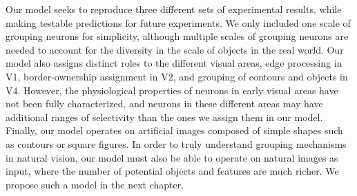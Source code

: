 Our model seeks to reproduce three different sets of experimental results, while making testable predictions for future experiments. 
We only included one scale of grouping neurons for simplicity, although 
multiple scales of grouping neurons are needed to account for the diversity in the scale of objects in the real world. Our model also assigns distinct roles to the different visual areas,  edge processing in V1, border-ownership assignment in V2, and grouping of contours and objects in V4. However, the physiological properties of neurons in early visual areas have not been fully characterized, and neurons in these different areas may have additional ranges of selectivity than the ones we assign them in our model. Finally, our model operates on artificial images composed of simple shapes such as contours or square
figures. In order to truly understand grouping mechanisms in natural
vision, our model must also be able to operate on natural images as input, where the number of potential objects and features are much
richer. We propose such a model in the next chapter.

